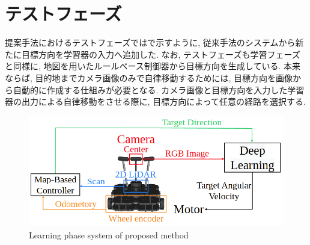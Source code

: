 
\section{テストフェーズ}
提案手法におけるテストフェーズではで示すように, 従来手法のシステムから新たに目標方向を学習器の入力へ追加した. なお, テストフェーズも学習フェーズと同様に, 地図を用いたルールベース制御器から目標方向を生成している. 本来ならば, 目的地までカメラ画像のみで自律移動するためには, 目標方向を画像から自動的に作成する仕組みが必要となる. 
カメラ画像と目標方向を入力した学習器の出力による自律移動をさせる際に, 目標方向によって任意の経路を選択する.

\vspace{3cm}

\begin{figure}[hbtp]
  \centering
 \includegraphics[keepaspectratio, scale=0.45]
      {images/suggest_test_phase.png}
 \caption{Learning phase system of proposed method}
 \label{Fig:suggest_test_phase}
\end{figure}

\newpage

